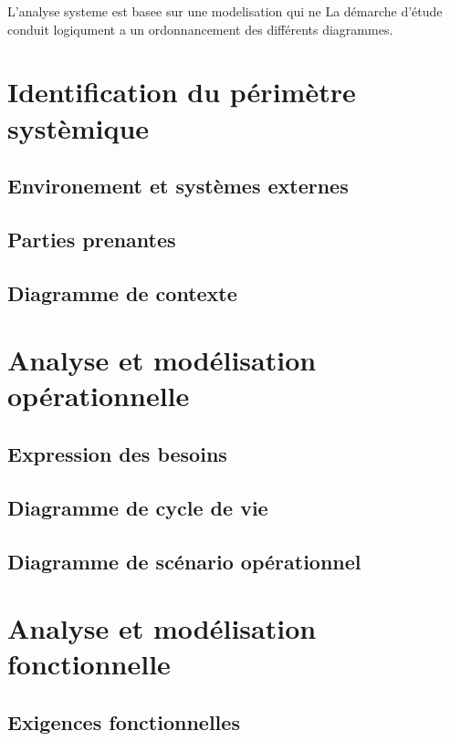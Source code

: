 \documentclass{article}
\begin{document}
L'analyse systeme est basee sur une modelisation qui ne 
La démarche d'étude conduit logiqument a un ordonnancement des différents diagrammes.






\section{Identification du périmètre systèmique}


\subsection{Environement et systèmes externes}
\subsection{Parties prenantes}
\subsection{Diagramme de contexte} 



\section{Analyse et modélisation opérationnelle}
\subsection{Expression des besoins}
\subsection{Diagramme de cycle de vie}

\subsection{Diagramme de scénario opérationnel}


\section{Analyse et modélisation fonctionnelle}



\subsection{Exigences fonctionnelles}
\end{document}
